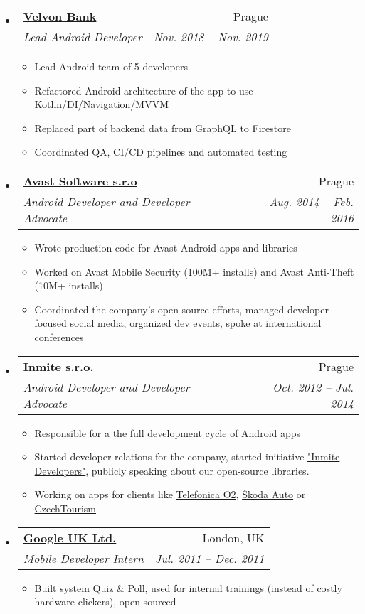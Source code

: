 \documentclass[letterpaper,11pt]{article}
\makeatletter
\newcommand{\resitem}[1]{\item #1 \vspace{-2pt}}
\newcommand{\ressubheading}[4]{
\begin{tabular*}{6.5in}{l@{\extracolsep{\fill}}r}
		\textbf{#1} & #2 \\
		\textit{#3} & \textit{#4} \\
\end{tabular*}\vspace{-6pt}}
\makeatother
\begin{document}
\begin{itemize}
	\item 
			\ressubheading{\href{https://airbank.net}{Velvon Bank}}{Prague}{Lead Android Developer}{Nov. 2018 -- Nov. 2019}
				{ \footnotesize
				\begin{itemize}
					\resitem{Lead Android team of 5 developers }
					\resitem{Refactored Android architecture of the app to use Kotlin/DI/Navigation/MVVM }
					\resitem{Replaced part of backend data from GraphQL to Firestore}
					\resitem{Coordinated QA, CI/CD pipelines and automated testing}
					
				\end{itemize}
				}					
				
	    \item 
			\ressubheading{\href{http://www.avast.com}{Avast Software s.r.o}}{Prague}{Android Developer and Developer Advocate}{Aug. 2014 -- Feb. 2016}
				{ \footnotesize
				\begin{itemize}
					\resitem{Wrote production code for Avast Android apps and libraries}
					\resitem{Worked on Avast Mobile Security (100M+ installs) and Avast Anti-Theft (10M+ installs)}
					\resitem {Coordinated the company’s open-source efforts, managed developer-focused social media, organized dev
events, spoke at international conferences}
				\end{itemize}
				}	
	    \item 
			\ressubheading{\href{http://www.inmite.eu}{Inmite s.r.o.}}{Prague}{Android Developer and Developer Advocate}{Oct. 2012 -- Jul. 2014}
				{ \footnotesize
				\begin{itemize}
					\resitem{Responsible for a the full development cycle of Android apps}
					\resitem {Started developer relations for the company, started initiative \href{http://inmite.github.io/}{"Inmite Developers"}, publicly speaking about our open-source libraries.}
					\resitem{Working on apps for clients like \href{https://play.google.com/store/apps/details?id=cz.o2.moje}{Telefonica O2}, \href{https://play.google.com/store/apps/details?id=eu.inmite.prj.skoda.service}{Škoda Auto} or \href{https://play.google.com/store/apps/details?id=com.czechtourism.top100.android}{CzechTourism}}
				\end{itemize}
				}
	    \item 
			\ressubheading{\href{http://www.google.com}{Google UK Ltd.}}{London, UK}{Mobile Developer Intern}{Jul. 2011 -- Dec. 2011}
				{ \footnotesize
				\begin{itemize}
					\resitem{Built system \href{http://code.google.com/p/quiz-and-poll/}{Quiz \& Poll}, used for internal trainings (instead of costly hardware clickers), open-sourced}

\end{itemize}}
\end{itemize}
\end{document}
